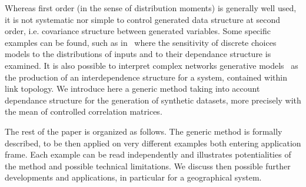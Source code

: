 Whereas first order (in the sense of distribution moments) is generally well used, it is not systematic nor simple to control generated data structure at second order, i.e. covariance structure between generated variables. Some specific examples can be found, such as in~\cite{ye2011investigation} where the sensitivity of discrete choices models to the distributions of inputs and to their dependance structure is examined. It is also possible to interpret complex networks generative models~\cite{newman2003structure} as the production of an interdependence structure for a system, contained within link topology. We introduce here a generic method taking into account dependance structure for the generation of synthetic datasets, more precisely with the mean of controlled correlation matrices.


The rest of the paper is organized as follows. The generic method is formally described, to be then applied on very different examples both entering application frame. Each example can be read independently and illustrates potentialities of the method and possible technical limitations. We discuss then possible further developments and applications, in particular for a geographical system.


